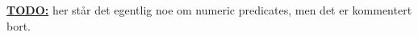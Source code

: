 \underline{\textbf{\LARGE TODO:}} her st\aa r det egentlig noe om numeric predicates, men det er kommentert bort. 

